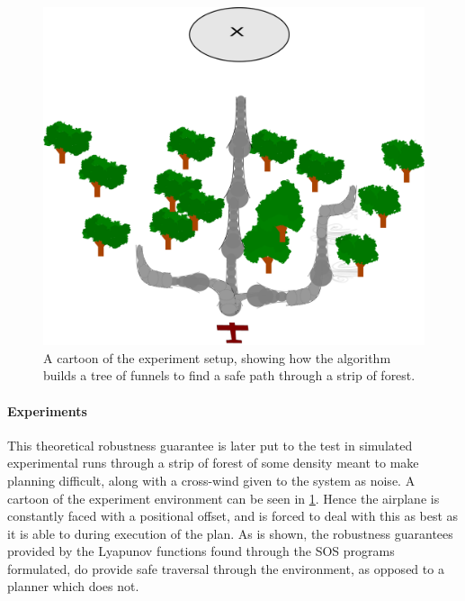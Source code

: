 \begin{figure}
  \centering
  \includegraphics[scale=.1]{figures/experiments/experiment-airplane-strip}
  \caption{A cartoon of the experiment setup, showing how the \rrtfunnel{}
    algorithm builds a tree of funnels to find a safe path through a strip of
    forest.}
  \label{fig:experiments-cartoon}
\end{figure}

\paragraph{Experiments}
This theoretical robustness guarantee is later put to the test in simulated
experimental runs through a strip of forest of some density meant to make
planning difficult, along with a cross-wind given to the system as noise. A
cartoon of the experiment environment can be seen in
\cref{fig:experiments-cartoon}. Hence the airplane is constantly faced with a
positional offset, and is forced to deal with this as best as it is able to
during execution of the plan. As is shown, the robustness guarantees provided by
the Lyapunov functions found through the \ac{SOS} programs formulated, do
provide safe traversal through the environment, as opposed to a planner which
does not.

